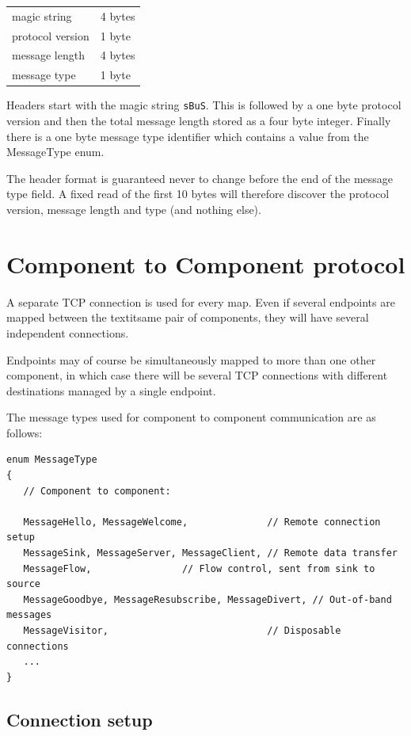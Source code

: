 \documentclass[12pt,a4paper,twoside]{article}
\renewcommand{\_}{\texttt{\symbol{95}}}
\begin{document}
\begin{tabular}{|ll|}
\hline
magic string       & 4 bytes\\
protocol version   & 1 byte\\
message length     & 4 bytes\\
message type       & 1 byte\\
\hline
\end{tabular}

Headers start with the magic string \texttt{sBuS}.
This is followed by a one byte protocol version and then
the total message length stored as a four byte integer.
Finally there is a one byte message type identifier
which contains a value from the MessageType enum.

The header format is guaranteed never to change before the end of
the message type field.
A fixed read of the first 10 bytes will therefore discover
the protocol version, message length and type (and nothing else).

\section{Component to Component protocol}
\label{cpt-cpt}

A separate TCP
connection is used for every map. Even if several endpoints are mapped
between the textit{same} pair of components, they will have several independent
connections.

Endpoints may of course be simultaneously mapped to more than one other
component, in which case there will be several TCP connections with
different destinations managed by a single endpoint.

The message types used for
component to component communication
are as follows:

\begin{verbatim}
enum MessageType
{
   // Component to component:
	
   MessageHello, MessageWelcome,              // Remote connection setup
   MessageSink, MessageServer, MessageClient, // Remote data transfer
   MessageFlow,                // Flow control, sent from sink to source
   MessageGoodbye, MessageResubscribe, MessageDivert, // Out-of-band messages
   MessageVisitor,                            // Disposable connections
   ...
}
\end{verbatim}

\subsection{Connection setup}
\end{document}
